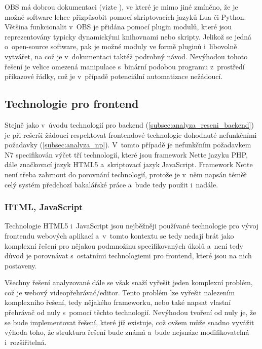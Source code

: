 \documentclass[thesis=M,czech]{FITthesis}[2012/06/26]
\begin{document}
	OBS má dobrou dokumentaci (vizte \cite{obs_doc}), ve které je mimo jiné zmíněno, že je možné software lehce přizpůsobit pomocí skriptovacích jazyků Lua či Python. Většina funkcionalit v~OBS je přidána pomocí plugin modulů, které jsou reprezentovány typicky dynamickými knihovnami nebo skripty. Jelikož se jedná o~open-source software, pak je možné moduly ve formě pluginů i~libovolně vytvářet, na což je v~dokumentaci taktéž podrobný návod. Nevýhodou tohoto řešení je velice omezená manipulace s~binární podobou programu z~prostředí příkazové řádky, což je v~případě potenciální automatizace nežádoucí.

\subsection{Technologie pro frontend} \label{subsec:analyza_reseni_frontend}
Stejně jako v~úvodu technologií pro backend (\ref{subsec:analyza_reseni_backend}) je při rešerši žádoucí respektovat frontendové technologie dohodnuté nefunkčními požadavky (\ref{subsec:analyza_np}). V~tomto případě je nefunkčním požadavkem N7 specifikován výčet tří technologií, které jsou framework Nette jazyku PHP, dále značkovací jazyk HTML5 a~skriptovací jazyk JavaScript. Framework Nette není třeba zahrnout do porovnání technologií, protože je v~něm napsán téměř celý systém předchozí bakalářské práce a~bude tedy použit i~nadále.


\subsubsection{HTML, JavaScript} \label{subsubsec:analyza_reseni_html}
Technologie HTML5 i~JavaScript jsou nejběžněji používané technologie pro vývoj frontendu webových aplikací a~v~tomto kontextu se tedy nedají brát jako komplexní řešení pro nějakou podmnožinu specifikovaných úkolů a~není tedy důvod je porovnávat s~ostatními technologiemi pro frontend, které jsou na nich postaveny. 
	
	Všechny řešení analyzované dále se však snaží vyřešit jeden komplexní problém, což je webový videopřehrávač/editor. Tento problém lze vyřešit nalezením komplexního řešení, tedy nějakého frameworku, nebo také napsat vlastní přehrávač od nuly s~pomocí těchto technologií. Nevýhodou tvoření od nuly je, že se bude implementovat řešení, které již existuje, což ovšem může snadno vyvážit výhoda toho, že struktura řešení bude známá a~bude nejsnáze modifikovatelná i~rozšiřitelná.
	
\end{document}
